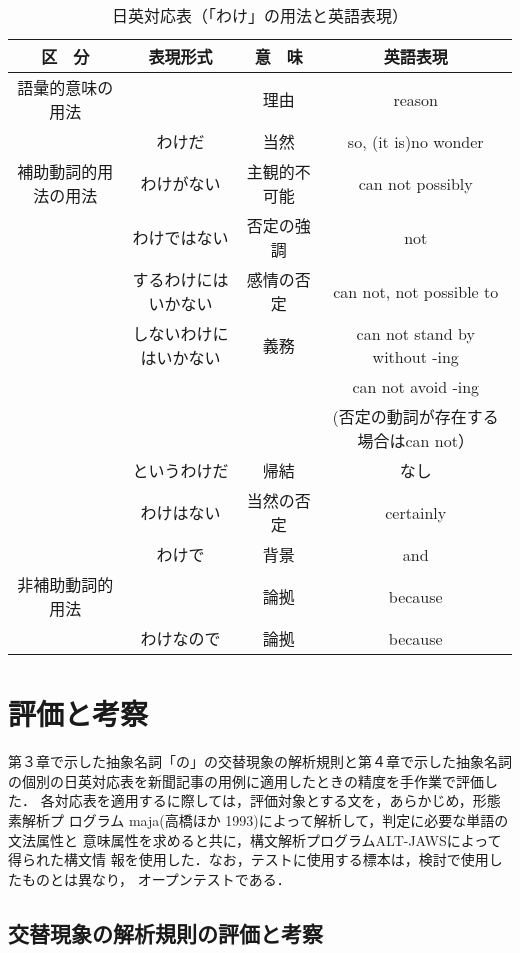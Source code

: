 \begin{table}[htbp]
\caption{日英対応表（「わけ」の用法と英語表現）}
\begin{center}
\begin{tabular}{|c|c|c|c|} \hline
区　分 & 表現形式 & 意　味 & 英語表現\\ \hline
語彙的意味の用法 & & 理由 & reason\\ \hline
 & わけだ & 当然 & so, (it is)no wonder\\ \cline{2-4}
補助動詞的用法の用法 & わけがない & 主観的不可能 & can not possibly\\ \cline{2-4}
 & わけではない & 否定の強調 & not\\ \cline{2-4}
 & するわけにはいかない & 感情の否定 & can not, not possible to\\ \cline{2-4}
 & しないわけにはいかない & 義務 & can not stand by without -ing\\
 & & & can not avoid -ing\\
 & & &(否定の動詞が存在する場合はcan not）\\ \cline{2-4}
 & というわけだ & 帰結 & なし\\ \cline{2-4}
 & わけはない & 当然の否定 & certainly\\ \hline
 & わけで & 背景 & and\\ \cline{3-4}
非補助動詞的用法 & & 論拠 & because\\ \cline{2-4}
 & わけなので & 論拠 & because\\ \hline
\end{tabular}
\end{center}
\end{table}

\section{評価と考察}

第３章で示した抽象名詞「の」の交替現象の解析規則と第４章で示した抽象名詞
の個別の日英対応表を新聞記事の用例に適用したときの精度を手作業で評価した．
各対応表を適用するに際しては，評価対象とする文を，あらかじめ，形態素解析プ
ログラム maja(高橋ほか 1993)によって解析して，判定に必要な単語の文法属性と
意味属性を求めると共に，構文解析プログラムALT-JAWSによって得られた構文情
報を使用した．なお，テストに使用する標本は，検討で使用したものとは異なり，
オープンテストである．

\subsection{交替現象の解析規則の評価と考察}
